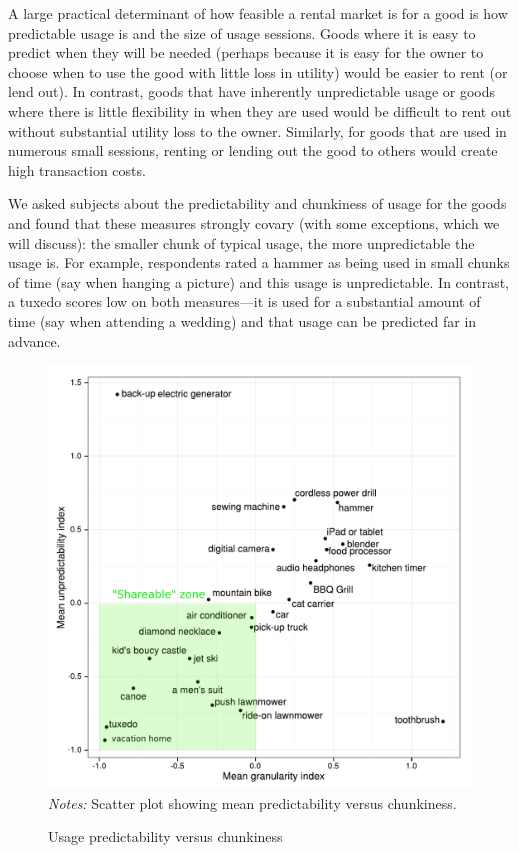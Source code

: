 \documentclass[11pt]{article}
\begin{document}
A large practical determinant of how feasible a rental market is for a good is how predictable usage is and the size of usage sessions. 
Goods where it is easy to predict when they will be needed (perhaps because it is easy for the owner to choose when to use the good with little loss in utility) would be easier to rent (or lend out).
In contrast, goods that have inherently unpredictable usage or goods where there is little flexibility in when they are used would be difficult to rent out without substantial utility loss to the owner.
Similarly, for goods that are used in numerous small sessions, renting or lending out the good to others would create high transaction costs.

We asked subjects about the predictability and chunkiness of usage for the goods and found that these measures strongly covary (with some exceptions, which we will discuss):
the smaller chunk of typical usage, the more unpredictable the usage is.
For example, respondents rated a hammer as being used in small chunks of time (say when hanging a picture) and this usage is unpredictable. 
In contrast, a tuxedo scores low on both measures---it is used for a substantial amount of time (say when attending a wedding) and that usage can be predicted far in advance.  

\begin{figure}
\centering 
\caption{Usage predictability versus chunkiness \label{fig:granularity_v_predictability}}
\begin{minipage}{0.60 \linewidth}
\includegraphics[width = \linewidth]{./plots/granularity_versus_predictability.pdf} 
\emph{Notes:} Scatter plot showing mean predictability versus chunkiness. 
\end{minipage} 
\end{figure} 
\end{document}
